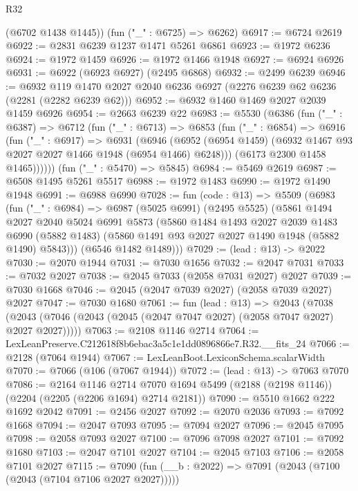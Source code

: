 \begin{lexlean}{R32}
\begin{coremodule}
      (@6702 @1438 @1445))
    (fun ("_" : @6725) => @6262)
@6917 := @6724 @2619
@6922 := @2831 @6239 @1237 @1471 @5261 @6861
@6923 := @1972 @6236
@6924 := @1972 @1459
@6926 := @1972 @1466 @1948
@6927 := @6924 @6926
@6931 := @6922 (@6923 @6927) (@2495 @6868)
@6932 := @2499 @6239
@6946 := @6932 @119 @1470 @2027 @2040 @6236 @6927 (@2276 @6239 @62 @6236 (@2281 (@2282 @6239 @62)))
@6952 := @6932 @1460 @1469 @2027 @2039 @1459 @6926
@6954 := @2663 @6239 @22
@6983 := @5530
    (@6386
      (fun ("_" : @6387) =>
      @6712
        (fun ("_" : @6713) =>
        @6853
          (fun ("_" : @6854) =>
          @6916
            (fun ("_" : @6917) =>
            @6931
              (@6946
                (@6952 (@6954 @1459) (@6932 @1467 @93 @2027 @2027 @1466 @1948 (@6954 @1466) @6248)))
              (@6173 @2300 @1458 @1465))))))
    (fun ("_" : @5470) => @5845)
@6984 := @5469 @2619
@6987 := @6508 @1495 @5261 @5517
@6988 := @1972 @1483
@6990 := @1972 @1490 @1948
@6991 := @6988 @6990
@7028 := fun (code : @13) =>
  @5509
    (@6983
      (fun ("_" : @6984) =>
      @6987
        (@5025 @6991)
        (@2495 @5525)
        (@5861
          @1494
          @2027
          @2040
          @5024
          @6991
          @5873
          (@5860
            @1484
            @1493
            @2027
            @2039
            @1483
            @6990
            (@5882 @1483)
            (@5860 @1491 @93 @2027 @2027 @1490 @1948 (@5882 @1490) @5843)))
        (@6546 @1482 @1489)))
@7029 := (lead : @13) -> @2022
@7030 := @2070 @1944
@7031 := @7030 @1656
@7032 := @2047 @7031
@7033 := @7032 @2027
@7038 := @2045 @7033 (@2058 @7031 @2027) @2027
@7039 := @7030 @1668
@7046 := @2045 (@2047 @7039 @2027) (@2058 @7039 @2027) @2027
@7047 := @7030 @1680
@7061 := fun (lead : @13) =>
  @2043 (@7038 (@2043 (@7046 (@2043 (@2045 (@2047 @7047 @2027) (@2058 @7047 @2027) @2027 @2027)))))
@7063 := @2108 @1146 @2714
@7064 := LexLeanPreserve.C212618f8b6ebac3a5c1e1dd0896866e7.R32.__fits_24
@7066 := @2128 (@7064 @1944)
@7067 := LexLeanBoot.LexiconSchema.scalarWidth
@7070 := @7066 (@106 (@7067 @1944))
@7072 := (lead : @13) -> @7063 @7070
@7086 := @2164
    @1146
    @2714
    @7070
    @1694
    @5499
    (@2188 (@2198 @1146))
    (@2204 (@2205 (@2206 @1694) @2714 @2181))
@7090 := @5510 @1662 @222 @1692 @2042
@7091 := @2456 @2027
@7092 := @2070 @2036
@7093 := @7092 @1668
@7094 := @2047 @7093
@7095 := @7094 @2027
@7096 := @2045 @7095
@7098 := @2058 @7093 @2027
@7100 := @7096 @7098 @2027
@7101 := @7092 @1680
@7103 := @2047 @7101 @2027
@7104 := @2045 @7103
@7106 := @2058 @7101 @2027
@7115 := @7090 (fun (__b : @2022) => @7091 (@2043 (@7100 (@2043 (@7104 @7106 @2027 @2027)))))

\end{coremodule}
\end{lexlean}
